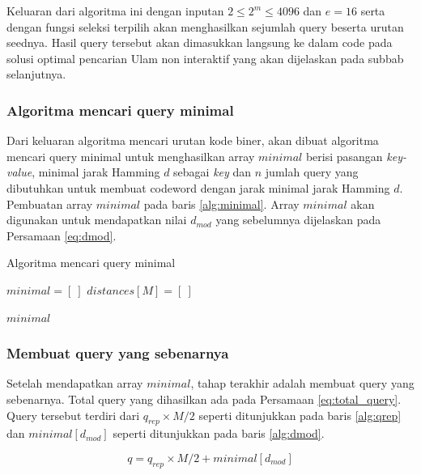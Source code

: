 Keluaran dari algoritma ini dengan inputan $2 \leq 2^m \leq 4096$ dan $e=16$ serta dengan fungsi seleksi terpilih akan menghasilkan sejumlah query beserta urutan seednya. Hasil query tersebut akan dimasukkan langsung ke dalam code pada solusi optimal pencarian Ulam non interaktif yang akan dijelaskan pada subbab selanjutnya.

\subsubsection{Algoritma mencari query minimal}

Dari keluaran algoritma mencari urutan kode biner, akan dibuat algoritma mencari query minimal untuk menghasilkan array $minimal$ berisi pasangan \textit{key-value}, minimal jarak Hamming $d$ sebagai \textit{key} dan $n$ jumlah query yang dibutuhkan untuk membuat codeword dengan jarak minimal jarak Hamming $d$. Pembuatan array $minimal$ pada baris \ref{alg:minimal}. Array $minimal$ akan digunakan untuk mendapatkan nilai $d_{mod}$ yang sebelumnya dijelaskan pada Persamaan \ref{eq:dmod}.

\begin{algorithm}[h]
\caption{Algoritma mencari query minimal}
\label{alg:generate_minimal_query}
  $minimal = [\ ]$\;
  $distances[M] = [\ ]$\;

  \For{$i = 0$ \KwTo $M-1$}{
    $min = \infty$\;
    $query = \text{generate\_query}(M, code\_order[m][i])$\;
    update the $distances$ after $query$\;
    $min$ = min($distances$)\;
    $minimal[min] = i$\;\label{alg:minimal}
    \lIf{$min \geq d$}{break}
  }
  \Return $minimal$\;
\end{algorithm}

\subsubsection{Membuat query yang sebenarnya}

Setelah mendapatkan array $minimal$, tahap terakhir adalah membuat query yang sebenarnya. Total query yang dihasilkan ada pada Persamaan \ref{eq:total_query}. Query tersebut terdiri dari $q_{rep} \times M/2$ seperti ditunjukkan pada baris \ref{alg:qrep} dan $minimal[d_{mod}]$ seperti ditunjukkan pada baris \ref{alg:dmod}.

\begin{equation}
\label{eq:total_query}
q = q_{rep} \times M/2 + minimal[d_{mod}]
\end{equation}

